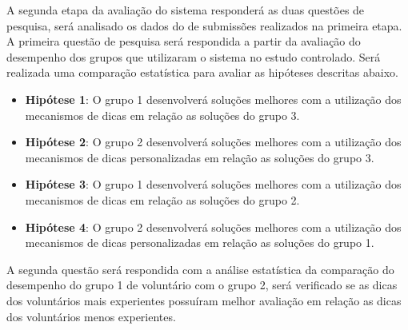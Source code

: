 A segunda etapa da avaliação do sistema responderá as duas questões de pesquisa, será analisado os dados do  de submissões realizados na primeira etapa. A primeira questão de pesquisa será respondida a partir da avaliação do desempenho dos grupos que utilizaram o sistema no estudo controlado. Será realizada uma comparação estatística para avaliar as hipóteses descritas abaixo. 

\begin{itemize}
	\item \textbf{Hipótese 1}: O grupo 1 desenvolverá soluções melhores com a utilização dos mecanismos de dicas em relação as soluções do grupo 3.
	\item \textbf{Hipótese 2}: O grupo 2 desenvolverá soluções melhores com a utilização dos mecanismos de dicas personalizadas em relação as soluções do grupo 3.	
	\item \textbf{Hipótese 3}: O grupo 1 desenvolverá soluções melhores com a utilização dos mecanismos de dicas em relação as soluções do grupo 2.	
	\item \textbf{Hipótese 4}: O grupo 2 desenvolverá soluções melhores com a utilização dos mecanismos de dicas personalizadas em relação as soluções do grupo 1.
\end{itemize}

A segunda questão será respondida com a análise estatística da comparação do desempenho do grupo 1 de voluntário com o grupo 2, será verificado se as dicas dos voluntários mais experientes possuíram melhor avaliação em relação as dicas dos voluntários menos experientes.